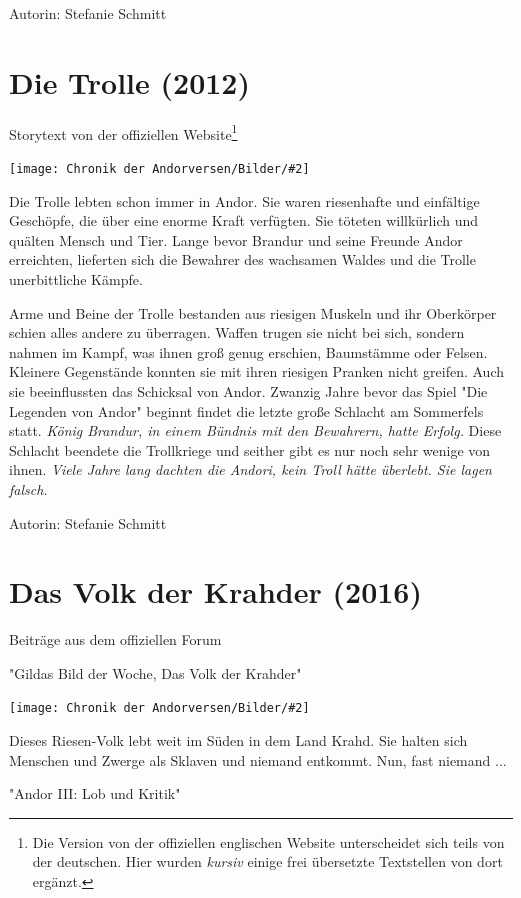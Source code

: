\documentclass[10pt, a4paper, oneside]{book}
\newcommand{\fillbreak}{\vspace*{\fill}\columnbreak}
\newcommand{\storytext}[1]{%
    \section{#1}%
    \label{Storytext: #1}%
}
\newcommand{\bildmitts}[2][height=0.32\textwidth,width=0.48\textwidth,keepaspectratio]{%
    \begin{center}
        \texttt{[image: Chronik der Andorversen/Bilder/\#2]}
    \end{center}
}
\begin{document}
\begin{multicols}{2}
Autorin: Stefanie Schmitt






\storytext{Die Trolle (2012)}

\begin{center}
    Storytext von der offiziellen Website\footnote{Die Version von der offiziellen englischen Website unterscheidet sich teils von der deutschen. Hier wurden \textit{kursiv} einige frei übersetzte Textstellen von dort ergänzt.}
\end{center}

\bildmitts{Die Trolle Bild 1.jpg}

Die Trolle lebten schon immer in Andor. Sie waren riesenhafte und einfältige Geschöpfe, die über eine enorme Kraft verfügten. Sie töteten willkürlich und quälten Mensch und Tier. Lange bevor Brandur und seine Freunde Andor erreichten, lieferten sich die Bewahrer des wachsamen Waldes und die Trolle unerbittliche Kämpfe.

Arme und Beine der Trolle bestanden aus riesigen Muskeln und ihr Oberkörper schien alles andere zu überragen. Waffen trugen sie nicht bei sich, sondern nahmen im Kampf, was ihnen groß genug erschien, Baumstämme oder Felsen. Kleinere Gegenstände konnten sie mit ihren riesigen Pranken nicht greifen. Auch sie beeinflussten das Schicksal von Andor. Zwanzig Jahre bevor das Spiel "Die Legenden von Andor" beginnt findet die letzte große Schlacht am Sommerfels statt. \textit{König Brandur, in einem Bündnis mit den Bewahrern, hatte Erfolg.} Diese Schlacht beendete die Trollkriege und seither gibt es nur noch sehr wenige von ihnen. \textit{Viele Jahre lang dachten die Andori, kein Troll hätte überlebt. Sie lagen falsch.}\bigskip

Autorin: Stefanie Schmitt




\fillbreak
\storytext{Das Volk der Krahder (2016)}

\begin{center}
    Beiträge aus dem offiziellen Forum

    "Gildas Bild der Woche, Das Volk der Krahder"
\end{center}

\bildmitts{Das Volk der Krahder}

Dieses Riesen-Volk lebt weit im Süden in dem Land Krahd. Sie halten sich Menschen und Zwerge als Sklaven und niemand entkommt. Nun, fast niemand ...

\begin{center}
    "Andor III: Lob und Kritik"
\end{center}


\end{multicols}
\end{document}
